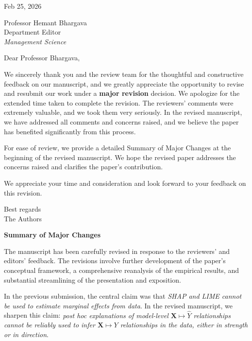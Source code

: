 \documentclass[11pt]{article}
\newcounter{se}[section]
\newcounter{reviewer}
\begin{document}
\begin{sf}

\flushleft{}
Feb 25, 2026
\vspace{15pt}

Professor Hemant Bhargava\\
Department Editor\\
\textit{Management Science}\\
\vspace{15pt}

Dear Professor Bhargava,\\
\vspace{20pt}



We sincerely thank you and the review team for the thoughtful and constructive feedback on our manuscript, and we greatly appreciate the opportunity to revise and resubmit our work under a \textbf{major revision} decision. We apologize for the extended time taken to complete the revision. The reviewers’ comments were extremely valuable, and we took them very seriously. In the revised manuscript, we have addressed all comments and concerns raised, and we believe the paper has benefited significantly from this process.



For ease of review, we provide a detailed Summary of Major Changes at the beginning of the revised manuscript. We hope the revised paper addresses the concerns raised and clarifies the paper’s contribution.

We appreciate your time and consideration and look forward to your feedback on this revision.



\vspace{10pt}

Best regards\\
The Authors

\newpage
\textbf{\Large Summary of Major Changes}\label{sec:majorchanges}

The manuscript has been carefully revised in response to the reviewers’ and editors’ feedback. The revisions involve further development of the paper’s conceptual framework, a comprehensive reanalysis of the empirical results, and substantial streamlining of the presentation and exposition.

In the previous submission, the central claim was that \emph{SHAP and LIME cannot be used to estimate marginal effects from data}. In the revised manuscript, we  sharpen this claim: \emph{post hoc explanations of model-level $\mathbf{X} \mapsto \hat{Y}$ relationships cannot be reliably used to infer $\mathbf{X}\mapsto Y$ relationships in the data, either in strength or in direction}.  


\end{sf}
\end{document}

